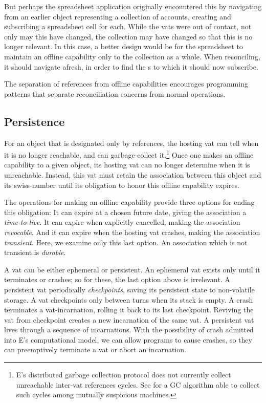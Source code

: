 \documentclass{llncs}
\begin{document}
But perhaps the spreadsheet application originally encountered this
 by navigating from an earlier object representing
a collection of accounts, creating and subscribing a spreadsheet cell
for each. While the vats were out of contact, not only may this
 have changed, the collection may have changed so
that this  is no longer relevant. In this case, a
better design would be for the spreadsheet to maintain an offline
capability only to the collection as a whole. When reconciling, it
should navigate afresh, in order to find the s to
which it should now subscribe.

The separation of references from offline capabilities encourages
programming patterns that separate reconciliation concerns from normal
operations.

\subsection{Persistence}

For an object that is designated only by references, the hosting vat
can tell when it is no longer reachable, and can garbage-collect
it.\footnote{
%
E's distributed garbage collection protocol does not currently collect
unreachable inter-vat references cycles. See \cite{bejar:gc} for a
GC algorithm able to collect such cycles among mutually suspicious
machines.}
%
Once one makes an offline capability to a given object, its hosting vat
can no longer determine when it is unreachable. Instead, this vat must
retain the association between this object and its swiss-number until
its obligation to honor this offline capability expires.

The operations for making an offline capability provide three options
for ending this obligation: It can expire at a chosen future date,
giving the association a \emph{time-to-live}. It can expire when
explicitly cancelled, making the association \emph{revocable}. And it
can expire when the hosting vat crashes, making the association
\emph{transient}. Here, we examine only this last option. An
association which is not transient is \emph{durable}.

A vat can be either ephemeral or persistent. An ephemeral vat exists
only until it terminates or crashes; so for these, the last option
above is irrelevant. A persistent vat periodically \emph{checkpoints},
saving its persistent state to non-volatile storage. A vat checkpoints
only between turns when its stack is empty. A crash terminates a
vat-incarnation, rolling it back to its last checkpoint. Reviving the
vat from checkpoint creates a new incarnation of the same vat. A
persistent vat lives through a sequence of incarnations. With the
possibility of crash admitted into E's computational model, we can
allow programs to cause crashes, so they can preemptively terminate a
vat or abort an incarnation.
\end{document}
